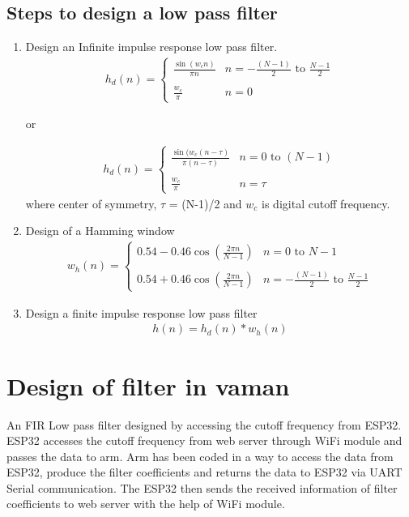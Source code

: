 \documentclass[journal,12pt,twocolumn]{IEEEtran}
\begin{document}
\subsection{Steps to design a low pass filter}
\begin{enumerate}
\item Design an Infinite impulse response low pass filter.
\begin{align}
h_d (n) = \begin{cases} 
      \frac{\sin(w_c n)}{\pi n} & n = -\frac{(N-1)}{2} \text{ to } \frac{N-1}{2} \\ \\
      \frac{w_c}{\pi} & n=0 
   \end{cases} 
\end{align}
\begin{center}
or
\end{center}
\begin{align}
h_d (n) = \begin{cases} 
      \frac{\sin(w_c (n-\tau)}{\pi (n-\tau)} & n = 0 \text{ to } (N-1) \\ \\
      \frac{w_c}{\pi} & n=\tau 
   \end{cases} 
\end{align}
where center of symmetry, $\tau$ = (N-1)/2 and $w_c$ is digital cutoff frequency.
\item Design of a Hamming window
\begin{align}
w_h(n) = \begin{cases} 
     0.54 - 0.46 \cos(\frac{2\pi n}{N-1}) & n=0 \text{ to } N - 1 \\ \\
      0.54 + 0.46 \cos(\frac{2\pi n}{N-1}) & n = -\frac{(N-1)}{2} \text{ to } \frac{N-1}{2}
   \end{cases} 
\end{align}
\item Design a finite impulse response low pass filter
\begin{align}
h(n) = h_d(n) * w_h(n)
\end{align}
\end{enumerate}
\section{Design of filter in vaman}
An FIR Low pass filter designed by accessing the cutoff frequency from ESP32. ESP32 accesses the cutoff frequency from web server through WiFi module and passes the data to arm. Arm has been coded in a way to access the data from ESP32, produce the filter coefficients and returns the data to ESP32 via UART Serial communication. The ESP32 then sends the received information of filter coefficients to web server with the help of WiFi module.
\end{document}

